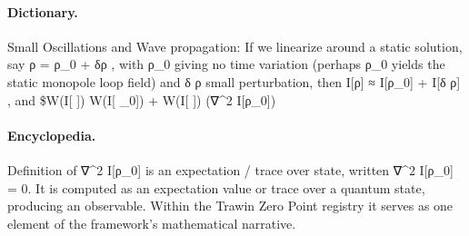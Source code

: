 \paragraph{Dictionary.}
Small Oscillations and Wave propagation: If we linearize around a static solution, say ρ = ρ\_0 + δρ , with ρ\_0 giving no time variation (perhaps ρ\_0 yields the static monopole loop field) and δ ρ small perturbation, then I[ρ] ≈ I[ρ\_0] + I[δ ρ] , and \$W(I[ ]) W(I[ \_0]) + W(I[ ]) (∇\textasciicircum{}2 I[ρ\_0])

\paragraph{Encyclopedia.}
Definition of ∇\textasciicircum{}2 I[ρ\_0] is an expectation / trace over state, written ∇\textasciicircum{}2 I[ρ\_0] = 0. It is computed as an expectation value or trace over a quantum state, producing an observable. Within the Trawin Zero Point registry it serves as one element of the framework's mathematical narrative.
